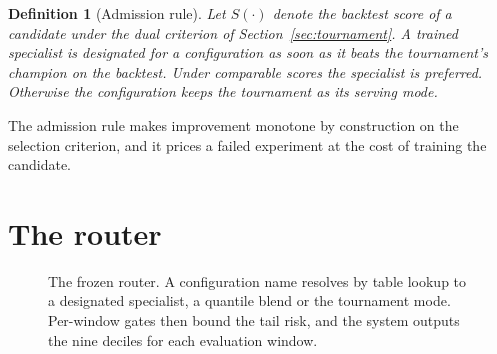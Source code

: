 \documentclass[11pt]{article}
\newtheorem{definition}{Definition}
\begin{document}
\begin{definition}[Admission rule]
\label{def:admission}
Let $S(\cdot)$ denote the backtest score of a candidate under the dual
criterion of Section~\ref{sec:tournament}. A trained specialist is
designated for a configuration as soon as it beats the tournament's
champion on the backtest. Under comparable scores the specialist is
preferred. Otherwise the configuration keeps the tournament as its serving
mode.
\end{definition}

The admission rule makes improvement monotone by construction on the
selection criterion, and it prices a failed experiment at the cost of
training the candidate.

\section{The router}
\label{sec:router}

\begin{figure}[t]
\centering
{}
\caption{The frozen router. A configuration name resolves by table lookup
to a designated specialist, a quantile blend or the tournament mode.
Per-window gates then bound the tail risk, and the system outputs the nine
deciles for each evaluation window.}
\label{fig:router}
\end{figure}
\end{document}

